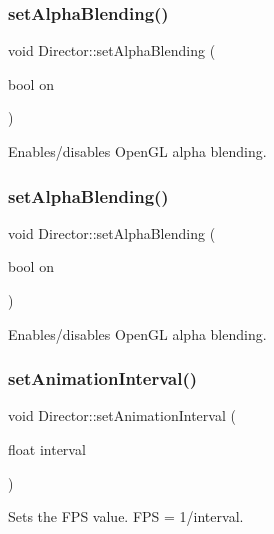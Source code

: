 \subsubsection{\texorpdfstring{set\+Alpha\+Blending()}{setAlphaBlending()}\hspace{0.1cm}{\footnotesize\ttfamily [1/2]}}
{\footnotesize\ttfamily void Director\+::set\+Alpha\+Blending (\begin{DoxyParamCaption}\item[{bool}]{on }\end{DoxyParamCaption})}

Enables/disables Open\+GL alpha blending. \mbox{\label{classDirector_a405b60d715c4828cc4541dfc5c34c04f}} 
\subsubsection{\texorpdfstring{set\+Alpha\+Blending()}{setAlphaBlending()}\hspace{0.1cm}{\footnotesize\ttfamily [2/2]}}
{\footnotesize\ttfamily void Director\+::set\+Alpha\+Blending (\begin{DoxyParamCaption}\item[{bool}]{on }\end{DoxyParamCaption})}

Enables/disables Open\+GL alpha blending. \mbox{\label{classDirector_a87d84ea16dfb7c991a4fcfd48e8d22ed}} 
\subsubsection{\texorpdfstring{set\+Animation\+Interval()}{setAnimationInterval()}\hspace{0.1cm}{\footnotesize\ttfamily [1/2]}}
{\footnotesize\ttfamily void Director\+::set\+Animation\+Interval (\begin{DoxyParamCaption}\item[{float}]{interval }\end{DoxyParamCaption})\hspace{0.3cm}{\ttfamily [pure virtual]}}

Sets the F\+PS value. F\+PS = 1/interval. 

